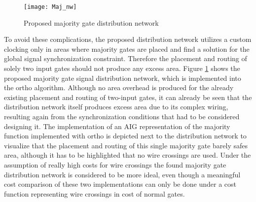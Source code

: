 \begin{figure}
	\centering
	\texttt{[image: Maj\_nw]}
	\caption{Proposed majority gate distribution network}\label{fig:QCA_Maj_nw}
\end{figure}


To avoid these complications, the proposed distribution network utilizes a custom clocking only in areas where majority gates are placed and find a solution for the global signal synchronization constraint. Therefore the placement and routing of solely two input gates should not produce any excess area. Figure \ref{fig:QCA_Maj_nw} shows the proposed majority gate signal distribution network, which is implemented into the ortho algorithm. Although no area overhead is produced for the already existing placement and routing of two-input gates, it can already be seen that the distribution network itself produces excess area due to its complex wiring, resulting again from the synchronization conditions that had to be considered designing it. The implementation of an AIG representation of the majority function implemented with ortho is depicted next to the distribution network to visualize that the placement and routing of this single majority gate barely safes area, although it has to be highlighted that no wire crossings are used. Under the assumption of really high costs for wire crossings the found majority gate distribution network is considered to be more ideal, even though a meaningful cost comparison of these two implementations can only be done under a cost function representing wire crossings in cost of normal gates.
